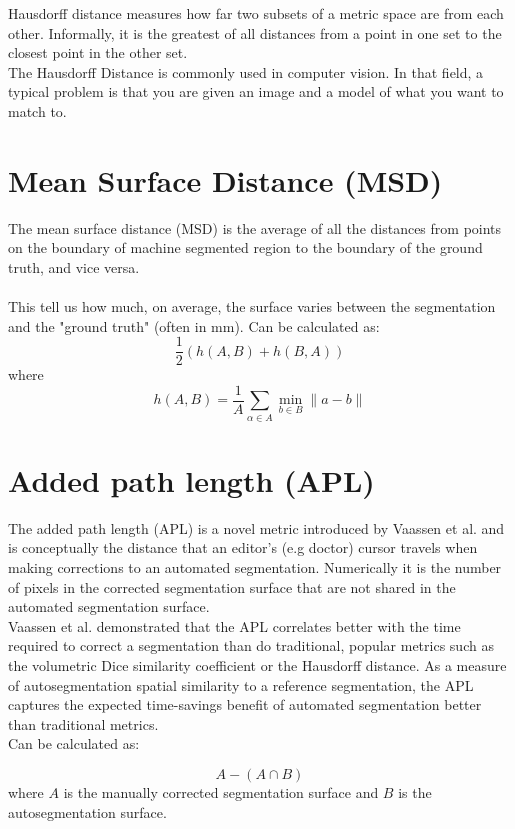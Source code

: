 \documentclass[a4paper, 11pt]{report}
\begin{document}
Hausdorff distance measures how far two subsets of a metric space are from each other. Informally, it is the greatest of all distances from a point in one set to the closest point in the other set.  \\

The Hausdorff Distance is commonly used in computer vision. In that field, a typical
problem is that you are given an image and a model of what you want to match to.

\section*{Mean Surface Distance (MSD)}

The mean surface distance (MSD) is the average of all the distances from points on the boundary of machine segmented region to the boundary of the ground truth, and vice versa. \\\\This tell us how much, on average, the surface varies between the segmentation and the "ground truth" (often in mm). Can be calculated as:
$$
\frac{1}{2}(h(A, B)+h(B, A))
$$
where
$$
h(A, B)=\frac{1}{A} \sum_{\alpha \in A} \min _{b \in B}\|a-b\|
$$
\section*{Added path length (APL)}
The added path length (APL) is a novel metric introduced by Vaassen et al. and is conceptually the distance that an editor's (e.g doctor) cursor travels when making corrections to an automated segmentation. Numerically it is the number of pixels in the corrected segmentation surface that are not shared in the automated segmentation surface. \\

Vaassen et al. demonstrated that the APL correlates better with the time required to correct a segmentation than do traditional, popular metrics such as the volumetric Dice similarity coefficient or the Hausdorff distance. As a measure of autosegmentation spatial similarity to a reference segmentation, the APL captures the expected time-savings benefit of automated segmentation better than traditional metrics. \\

Can be calculated as: 

$$
A-(A \cap B)
$$
where $A$ is the manually corrected segmentation surface and $B$ is the autosegmentation surface.\\
\end{document}
